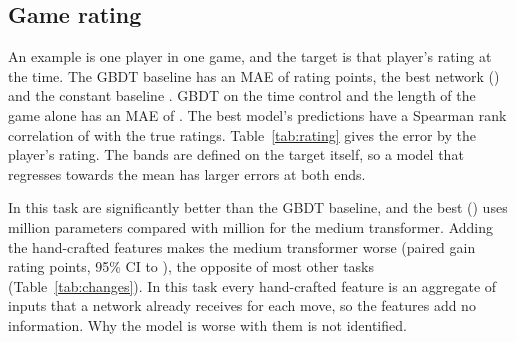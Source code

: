 \documentclass[11pt]{article}
\begin{document}
\subsection{Game rating}
\label{sec:game-rating}

An example is one player in one game, and the target is that player's rating
at the time. The GBDT baseline has an MAE of
 rating points, the best network
()  and the
constant baseline . GBDT on the time control and
the length of the game alone has an MAE of
. The best model's predictions have a
Spearman rank correlation of  with the true
ratings. Table~\ref{tab:rating} gives the error by the player's rating. The
bands are defined on the target itself, so a model that regresses towards
the mean has larger errors at both ends.

\begin{table}[htbp]\centering\small
{}
\caption{Game rating: MAE of each model in rating points, by the player's
rating.}
\label{tab:rating}
\end{table}

In this task  are significantly better than
the GBDT baseline, and the best () uses
 million parameters compared
with  million for
the medium transformer. Adding the hand-crafted features makes the medium
transformer worse (paired gain
 rating
points, 95\% CI
 to
),
the opposite of most other tasks (Table~\ref{tab:changes}). In this task
every hand-crafted feature is an aggregate of inputs that a network already
receives for each move, so the features add no information. Why the model is
worse with them is not identified.
\end{document}
